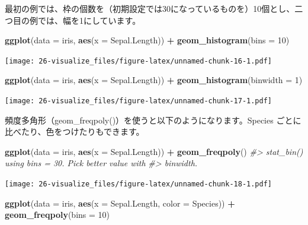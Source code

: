 \documentclass[
  xelatex, ja=standard]{bxjsbook}
\newenvironment{Shaded}{\begin{snugshade}}{\end{snugshade}}
\newcommand{\AttributeTok}[1]{\textcolor[rgb]{0.13,0.29,0.53}{#1}}
\newcommand{\CommentTok}[1]{\textcolor[rgb]{0.56,0.35,0.01}{\textit{#1}}}
\newcommand{\DecValTok}[1]{\textcolor[rgb]{0.00,0.00,0.81}{#1}}
\newcommand{\FunctionTok}[1]{\textcolor[rgb]{0.13,0.29,0.53}{\textbf{#1}}}
\newcommand{\NormalTok}[1]{#1}
\newcommand{\SpecialCharTok}[1]{\textcolor[rgb]{0.81,0.36,0.00}{\textbf{#1}}}
\theoremstyle{definition}
\theoremstyle{definition}
\theoremstyle{definition}
\theoremstyle{definition}
\theoremstyle{remark}
\begin{document}
最初の例では、枠の個数を（初期設定では30になっているものを）10個とし、二つ目の例では、幅を1にしています。

\begin{Shaded}
\begin{Highlighting}[]
\FunctionTok{ggplot}\NormalTok{(}\AttributeTok{data =}\NormalTok{ iris, }\FunctionTok{aes}\NormalTok{(}\AttributeTok{x =}\NormalTok{ Sepal.Length)) }\SpecialCharTok{+}
  \FunctionTok{geom\_histogram}\NormalTok{(}\AttributeTok{bins =} \DecValTok{10}\NormalTok{)}
\end{Highlighting}
\end{Shaded}

\texttt{[image: 26-visualize\_files/figure-latex/unnamed-chunk-16-1.pdf]}

\begin{Shaded}
\begin{Highlighting}[]
\FunctionTok{ggplot}\NormalTok{(}\AttributeTok{data =}\NormalTok{ iris, }\FunctionTok{aes}\NormalTok{(}\AttributeTok{x =}\NormalTok{ Sepal.Length)) }\SpecialCharTok{+}
  \FunctionTok{geom\_histogram}\NormalTok{(}\AttributeTok{binwidth =} \DecValTok{1}\NormalTok{)}
\end{Highlighting}
\end{Shaded}

\texttt{[image: 26-visualize\_files/figure-latex/unnamed-chunk-17-1.pdf]}

頻度多角形（geom\_freqpoly()）を使うと以下のようになります。Species ごとに比べたり、色をつけたりもできます。

\begin{Shaded}
\begin{Highlighting}[]
\FunctionTok{ggplot}\NormalTok{(}\AttributeTok{data =}\NormalTok{ iris, }\FunctionTok{aes}\NormalTok{(}\AttributeTok{x =}\NormalTok{ Sepal.Length)) }\SpecialCharTok{+}
  \FunctionTok{geom\_freqpoly}\NormalTok{()}
\CommentTok{\#\textgreater{} \textasciigrave{}stat\_bin()\textasciigrave{} using \textasciigrave{}bins = 30\textasciigrave{}. Pick better value with}
\CommentTok{\#\textgreater{} \textasciigrave{}binwidth\textasciigrave{}.}
\end{Highlighting}
\end{Shaded}

\texttt{[image: 26-visualize\_files/figure-latex/unnamed-chunk-18-1.pdf]}

\begin{Shaded}
\begin{Highlighting}[]
\FunctionTok{ggplot}\NormalTok{(}\AttributeTok{data =}\NormalTok{ iris, }\FunctionTok{aes}\NormalTok{(}\AttributeTok{x =}\NormalTok{ Sepal.Length, }\AttributeTok{color =}\NormalTok{ Species)) }\SpecialCharTok{+}
  \FunctionTok{geom\_freqpoly}\NormalTok{(}\AttributeTok{bins =} \DecValTok{10}\NormalTok{)}
\end{Highlighting}
\end{Shaded}
\end{document}
